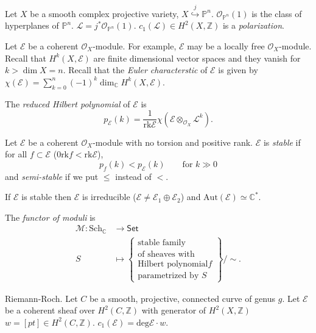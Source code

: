 Let $X$ be a smooth complex projective variety,
$X \overset{j}{\hookrightarrow}\mathbb{P}^n$.
$\mathcal{O}_{\mathbb{P}^n}(1)$ is the class of hyperplanes of $\mathbb{P}^n$.
$\mathcal{L}=j^*\mathcal{O}_{\mathbb{P}^n}(1)$.
$c_1(\mathcal{L})\in H^2(X,\mathbb{Z})$ is
a {\it polarization}.

Let $\mathcal{E}$ be a coherent $\mathcal{O}_X$-module.
For example, $\mathcal{E}$ may be a locally free $\mathcal{O}_X$-module.
Recall that $H^k(X,\mathcal{E})$ are finite dimensional vector spaces
and they vanish for $k>\dim X=n$.
Recall that the {\it Euler characterstic} of $\mathcal{E}$ 
is given by
$\chi(\mathcal{E})=\sum_{k=0}^n(-1)^k\dim_{\mathbb{C}}H^k(X,\mathcal{E})$.

The {\it reduced Hilbert polynomial} of $\mathcal{E}$ is
$$
p_{\mathcal{E}}(k)=\frac{1}{\text{rk}\mathcal{E}}
\chi(\mathcal{E}\otimes_{\mathcal{O}_X}\mathcal{L}^k).
$$

\begin{definition}
\label{definition-stable-module}
Let $\mathcal{E}$ be a coherent $\mathcal{O}_X$-module
with no torsion and positive rank.
$\mathcal{E}$ is {\it stable} if for all $f \subset \mathcal{E}$ 
($0 \text{rk} f<\text{rk}\mathcal{E}$),
$$
p_f(k)<p_{\mathcal{E}}(k)\qquad \text{for } k\gg 0
$$
and {\it semi-stable} if we put $\leq$ instead of $<$.

\begin{lemma}
\label{lemma-stable}
If $\mathcal{E}$ is stable then $\mathcal{E}$ is irreducible
($\mathcal{E} \neq  \mathcal{E}_1 \oplus \mathcal{E}_2$)
and $\text{Aut}(\mathcal{E})\simeq \mathbb{C}^*$.
\end{lemma}

\end{definition} 

The {\it functor of moduli} is
\begin{align*}
\mathcal{M}: \text{Sch}_\mathbb{C} &\longrightarrow \mathsf{Set} \\
S
&\longmapsto
\left\{
\substack{\text{stable family}  \\ \text{of sheaves with} \\
\text{Hilbert polynomial} f\\
\text{parametrized by $S$}} \right\}\Big/\sim.
\end{align*}

\medskip\noindent
Riemann-Roch.
Let $C$ be a smooth, projective, connected curve
of genus $g$.
Let $\mathcal{E}$ be a coherent sheaf over $H^2(C,\mathbb{Z})$ 
with generator of $H^2(X,\mathbb{Z})$ 
$w=[pt] \in H^2(C,\mathbb{Z})$.
$c_1(\mathcal{E})=\text{deg}\mathcal{E}\cdot w$.

